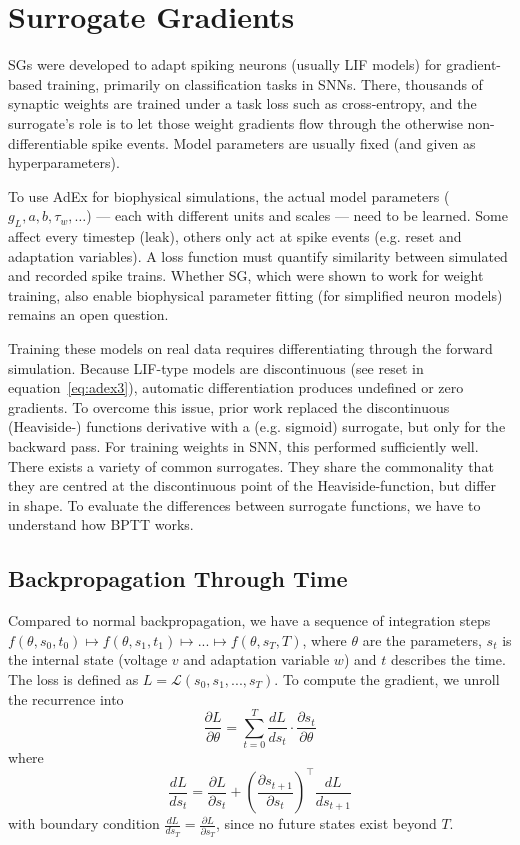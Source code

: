 \section{Surrogate Gradients}\label{sec:bg:surrogate-gradients}
\glspl{SG} were developed to adapt spiking neurons (usually \gls{LIF} models) for gradient-based training, primarily on classification tasks in \glspl{SNN}.
There, thousands of synaptic weights are trained under a task loss such as cross-entropy, and the surrogate's role is to let those weight gradients flow through the otherwise non-differentiable spike events.
Model parameters are usually fixed (and given as hyperparameters).

To use \gls{AdEx} for biophysical simulations, the actual model parameters ($g_L, a, b, \tau_w, \dots$) --- each with different units and scales --- need to be learned.
Some affect every timestep (leak), others only act at spike events (e.g. reset and adaptation variables).
A loss function must quantify similarity between simulated and recorded spike trains.
Whether \gls{SG}, which were shown to work for weight training, also enable biophysical parameter fitting (for simplified neuron models) remains an open question.

Training these models on real data requires differentiating through the forward simulation.
Because \gls{LIF}-type models are discontinuous (see reset in equation~\ref{eq:adex3}), automatic differentiation produces undefined or zero gradients.
To overcome this issue, prior work replaced the discontinuous (Heaviside-) functions derivative with a (e.g. sigmoid) surrogate, but only for the backward pass.
For training weights in \gls{SNN}, this performed sufficiently well.
There exists a variety of common surrogates.
They share the commonality that they are centred at the discontinuous point of the Heaviside-function, but differ in shape.
To evaluate the differences between surrogate functions, we have to understand how \gls{BPTT} works.

\subsection{Backpropagation Through Time}\label{sec:bg:sg:bptt}
Compared to normal backpropagation, we have a sequence of integration steps $f(\theta, s_0, t_0) \mapsto f(\theta, s_1, t_1) \mapsto ... \mapsto f(\theta, s_T, T)$,
where $\theta$ are the parameters, $s_t$ is the internal state (voltage $v$ and adaptation variable $w$) and $t$ describes the time.
The loss is defined as $L = \mathcal{L}(s_0, s_1, ..., s_T)$. To compute the gradient, we unroll the recurrence into
\begin{equation}
  \frac{\partial L}{\partial \theta} = \sum_{t=0}^{T} \frac{d L}{d s_t} \cdot \frac{\partial s_t}{\partial \theta}
  \label{eq:bptt}
\end{equation}
where
\begin{equation}
  \frac{dL}{ds_t} = \frac{\partial L}{\partial s_t} + \left(\frac{\partial s_{t+1}}{\partial s_t}\right)^\top \frac{dL}{ds_{t+1}}
  \label{eq:bptt2}
\end{equation}
with boundary condition $\frac{dL}{ds_T} = \frac{\partial L}{\partial s_T}$, since no future states exist beyond $T$.


